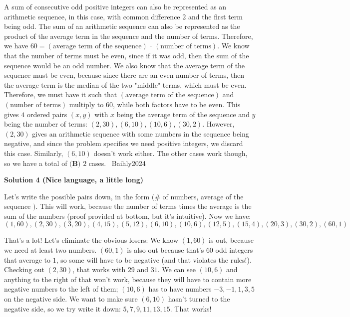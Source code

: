 \begin{enumerate}
A sum of consecutive odd positive integers can also be represented as an arithmetic sequence, in this case, with common difference 2 and the first term being odd. The sum of an arithmetic sequence can also be represented as the product of the average term in the sequence and the number of terms. Therefore, we have $60=(\text{average term of the sequence})$ $\cdot$ $(\text{number of terms})$. We know that the number of terms must be even, since if it was odd, then the sum of the sequence would be an odd number. We also know that the average term of the sequence must be even, because since there are an even number of terms, then the average term is the median of the two "middle" terms, which must be even. Therefore, we must have it such that $(\text{average term of the sequence})$ and $(\text{number of terms})$ multiply to 60, while both factors have to be even. This gives $4$ ordered pairs $(x,y)$ with $x$ being the average term of the sequence and $y$ being the number of terms: $(2, 30), (6, 10), (10, 6), (30, 2)$. However, $(2, 30)$ gives an arithmetic sequence with some numbers in the sequence being negative, and since the problem specifies we need positive integers, we discard this case. Similarly, $(6, 10)$ doesn't work either. The other cases work though, so we have a total of $\boxed{\textbf{(B) }2}$ cases. ~Baihly2024

 



\textbf{Solution 4 (Nice language, a little long)}

Let's write the possible pairs down, in the form $($\# of numbers, average of the sequence $)$. This will work, because the number of terms times the average is the sum of the numbers (proof provided at bottom, but it's intuitive). Now we have:
 \[(1,60), (2,30), (3,20), (4,15), (5,12), (6,10), (10,6), (12,5), (15,4), (20,3), (30,2), (60,1)\]

 That's a lot! Let's eliminate the obvious losers: We know $(1,60)$ is out, because we need at least two numbers. $(60, 1)$ is also out because that's $60$ odd integers that average to $1$, so some will have to be negative (and that violates the rules!). Checking out $(2,30)$, that works with $29$ and $31$. We can see $(10, 6)$ and anything to the right of that won't work, because they will have to contain more negative numbers to the left of them; $(10,6)$ has to have numbers $-3, -1, 1, 3, 5$ on the negative side. We want to make sure $(6, 10)$ hasn't turned to the negative side, so we try write it down: $5, 7, 9, 11, 13, 15$. That works!


\end{enumerate}

